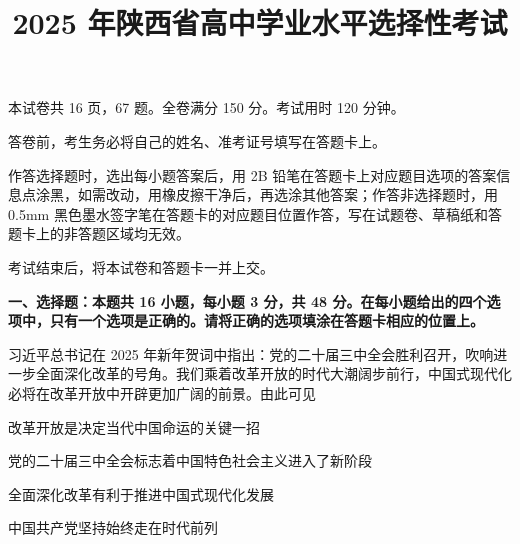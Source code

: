 \documentclass{exam-zh}
\title{2025 年陕西省高中学业水平选择性考试}
\begin{document}
\secret

\maketitle

本试卷共 16 页，67 题。全卷满分 150 分。考试用时 120 分钟。

\begin{notice}[][itemsep=0pt, parsep=0pt, topsep=0pt, partopsep=0pt]
\item 答卷前，考生务必将自己的姓名、准考证号填写在答题卡上。
\item 作答选择题时，选出每小题答案后，用 2B 铅笔在答题卡上对应题目选项的答案信息点涂黑，如需改动，用橡皮擦干净后，再选涂其他答案；作答非选择题时，用 0.5mm 黑色墨水签字笔在答题卡的对应题目位置作答，写在试题卷、草稿纸和答题卡上的非答题区域均无效。
\item 考试结束后，将本试卷和答题卡一并上交。
\end{notice}

\begin{flushleft}
  {\bfseries 一、选择题：本题共 16 小题，每小题 3 分，共 48 分。在每小题给出的四个选项中，只有一个选项是正确的。请将正确的选项填涂在答题卡相应的位置上。}
\end{flushleft}
\vspace{-1em}

\begin{question}
  习近平总书记在 2025 年新年贺词中指出：党的二十届三中全会胜利召开，吹响进一步全面深化改革的号角。我们乘着改革开放的时代大潮阔步前行，中国式现代化必将在改革开放中开辟更加广阔的前景。由此可见

   改革开放是决定当代中国命运的关键一招

   党的二十届三中全会标志着中国特色社会主义进入了新阶段

   全面深化改革有利于推进中国式现代化发展

   中国共产党坚持始终走在时代前列

  \begin{choices}
  \item {}
  \item {}
  \item {}
  \item {}
  \end{choices}
\end{question}
\end{document}

